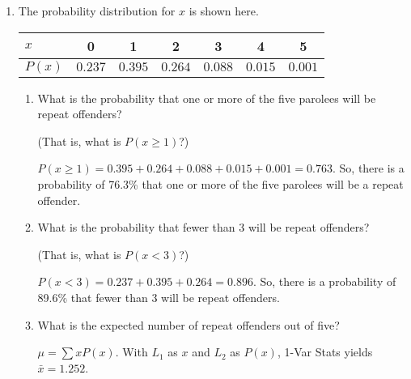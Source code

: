 \documentclass{article}
\newcommand{\answer}[1]{\color{white}#1}
\begin{document}
\begin{enumerate}
	\begin{enumerate}
	\item The probability distribution for $x$ is shown here. 
	
	\begin{tabular}{l|c|c|c|c|c|c}
	\hline
	$x$ & \hspace{0.25cm} 0 \hspace{0.25cm} & \hspace{0.25cm} 1 \hspace{0.25cm} & \hspace{0.25cm} 2 \hspace{0.25cm} & \hspace{0.25cm} 3 \hspace{0.25cm} & \hspace{0.25cm} 4 \hspace{0.25cm} &  \hspace{0.25cm} 5 \hspace{0.25cm} \\
	\hline
	$P(x)$ & $0.237$ & $0.395$ & $0.264$ & $0.088$ & $0.015$ & $0.001$ \\
	\hline
	\end{tabular} 

		\begin{enumerate}
		\item What is the probability that one or more of the five parolees will be repeat offenders?  
		
		(That is, what is $P(x \geq 1)$?) 
		
		{\answer $P(x\geq 1) = 0.395 + 0.264 + 0.088 + 0.015 + 0.001 = 0.763$.  So, there is a probability of 76.3\% that one or more of the five parolees will be a repeat offender.
		} 
		
		\item What is the probability that fewer than 3 will be repeat offenders?  
		
		(That is, what is $P(x < 3)$?) 
		
		{\answer $P(x < 3) = 0.237 + 0.395 + 0.264 = 0.896$.  So, there is a probability of 89.6\% that fewer than 3 will be repeat offenders.
		} 
		
		\item What is the expected number of repeat offenders out of five? 
		
		{\answer $\mu = \sum xP(x)$.  With $L_1$ as $x$ and $L_2$ as $P(x)$, 1-Var Stats yields $\bar{x} = 1.252$.
		} 
		\end{enumerate}
	\end{enumerate}


\end{enumerate}
\end{document}
